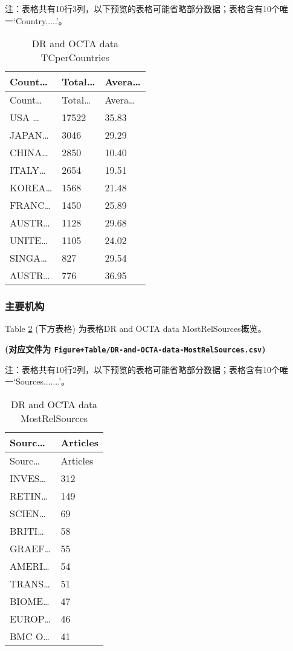 \documentclass[
]{article}
\begin{document}
\begin{center}\begin{tcolorbox}[colback=gray!10, colframe=gray!50, width=0.9\linewidth, arc=1mm, boxrule=0.5pt]注：表格共有10行3列，以下预览的表格可能省略部分数据；表格含有10个唯一`Country.....'。
\end{tcolorbox}
\end{center}

\begin{longtable}[]{@{}lll@{}}
\caption{\label{tab:DR-and-OCTA-data-TCperCountries}DR and OCTA data TCperCountries}\tabularnewline
\toprule
Count\ldots{} & Total\ldots{} & Avera\ldots{}\tabularnewline
\midrule
\endfirsthead
\toprule
Count\ldots{} & Total\ldots{} & Avera\ldots{}\tabularnewline
\midrule
\endhead
USA \ldots{} & 17522 & 35.83\tabularnewline
JAPAN\ldots{} & 3046 & 29.29\tabularnewline
CHINA\ldots{} & 2850 & 10.40\tabularnewline
ITALY\ldots{} & 2654 & 19.51\tabularnewline
KOREA\ldots{} & 1568 & 21.48\tabularnewline
FRANC\ldots{} & 1450 & 25.89\tabularnewline
AUSTR\ldots{} & 1128 & 29.68\tabularnewline
UNITE\ldots{} & 1105 & 24.02\tabularnewline
SINGA\ldots{} & 827 & 29.54\tabularnewline
AUSTR\ldots{} & 776 & 36.95\tabularnewline
\bottomrule
\end{longtable}

\hypertarget{ux4e3bux8981ux673aux6784}{%
\subsubsection{主要机构}\label{ux4e3bux8981ux673aux6784}}

Table \ref{tab:DR-and-OCTA-data-MostRelSources} (下方表格) 为表格DR and OCTA data MostRelSources概览。

\textbf{(对应文件为 \texttt{Figure+Table/DR-and-OCTA-data-MostRelSources.csv})}

\begin{center}\begin{tcolorbox}[colback=gray!10, colframe=gray!50, width=0.9\linewidth, arc=1mm, boxrule=0.5pt]注：表格共有10行2列，以下预览的表格可能省略部分数据；表格含有10个唯一`Sources.......'。
\end{tcolorbox}
\end{center}

\begin{longtable}[]{@{}ll@{}}
\caption{\label{tab:DR-and-OCTA-data-MostRelSources}DR and OCTA data MostRelSources}\tabularnewline
\toprule
Sourc\ldots{} & Articles\tabularnewline
\midrule
\endfirsthead
\toprule
Sourc\ldots{} & Articles\tabularnewline
\midrule
\endhead
INVES\ldots{} & 312\tabularnewline
RETIN\ldots{} & 149\tabularnewline
SCIEN\ldots{} & 69\tabularnewline
BRITI\ldots{} & 58\tabularnewline
GRAEF\ldots{} & 55\tabularnewline
AMERI\ldots{} & 54\tabularnewline
TRANS\ldots{} & 51\tabularnewline
BIOME\ldots{} & 47\tabularnewline
EUROP\ldots{} & 46\tabularnewline
BMC O\ldots{} & 41\tabularnewline
\bottomrule
\end{longtable}
\end{document}
